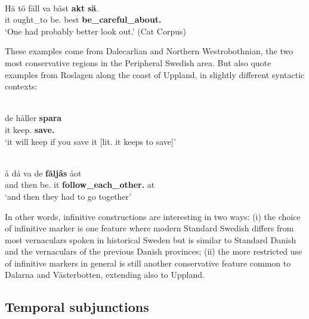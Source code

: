 \ea\label{}
\\
\gll Hä  tö  fäll  va  bäst  \textbf{akt}\textbf{  sä}.\\
it  ought\_to  {\prag}  be.{\inf}  best  \textbf{be\_careful\_about.{\inf}} \textbf{{}}\\
\glt ‘One had probably better look out.’ (Cat Corpus)
\z

These examples come from Dalecarlian and Northern Westrobothnian, the two most conservative regions in the Peripheral Swedish area. But \citet[99]{KällskogEtAl1993} also quote examples from Roslagen along the coast of Uppland, in slightly different syntactic contexts:

\ea\label{}
\\
\gll de  håller  \textbf{spara}\\
it  keep.{\prs}  \textbf{save.{\inf}}\\
\glt ‘it will keep if you save it [lit. it keeps to save]’
\z

\ea\label{}
\\
\gll å  då  va  de  \textbf{fåljâs} åot\\
and  then  be.{\pst}  it  \textbf{follow\_each\_other.{\inf}} at\\
\glt ‘and then they had to go together’ 
\z

In other words, infinitive constructions are interesting in two ways: (i) the choice of infinitive marker is one feature where modern Standard Swedish differs from most vernaculars spoken in historical Sweden but is similar to Standard Danish and the vernaculars of the previous Danish provinces; (ii) the more restricted use of infinitive markers in general is still another conservative feature common to Dalarna and Västerbotten, extending also to Uppland. 

\subsection{Temporal subjunctions}

